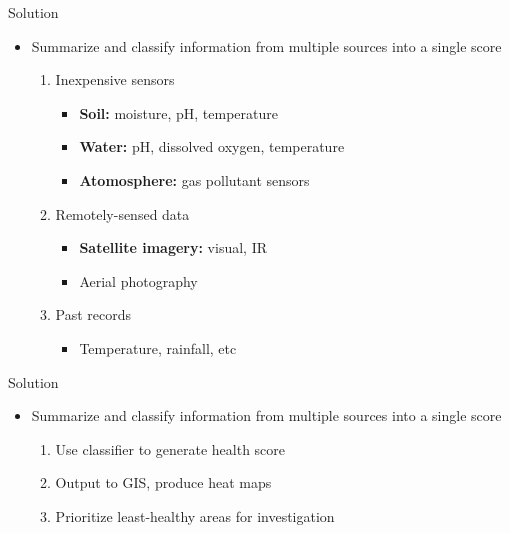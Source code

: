 \documentclass{beamer}
\begin{document}
\begin{frame}
    \huge{Solution}\normalsize
    \begin{itemize}
        \item<1->\large{Summarize and classify information from \alert{multiple sources} into a single score}\normalsize
        \begin{enumerate}
            \item<2-> \alert<2-5>{Inexpensive sensors}
            \begin{itemize}
                \item<3->\textbf{Soil:} moisture, pH, temperature
                \item<4->\textbf{Water:} pH, dissolved oxygen, temperature
                \item<5->\textbf{Atomosphere:} gas pollutant sensors
            \end{itemize}
            \item<6-> \alert<6-8>{Remotely-sensed data}
            \begin{itemize}
                \item<7->\textbf{Satellite imagery:} visual, IR
                \item<8->Aerial photography
            \end{itemize}
            \item<9->\alert<9-10>Past records
            \begin{itemize}
                \item<10-> Temperature, rainfall, etc
            \end{itemize}
        \end{enumerate}
    \end{itemize}
\end{frame}

\begin{frame}
    \huge{Solution}\normalsize
    \begin{itemize}
        \item<1->\large{Summarize and classify information from multiple sources into \alert{a single score}}\normalsize
        \begin{enumerate}
            \item<2-> Use classifier to generate health score
            \item<3-> Output to GIS, produce heat maps
            \item<4-> Prioritize least-healthy areas for investigation
        \end{enumerate}
    \end{itemize}
\end{frame}
\end{document}
